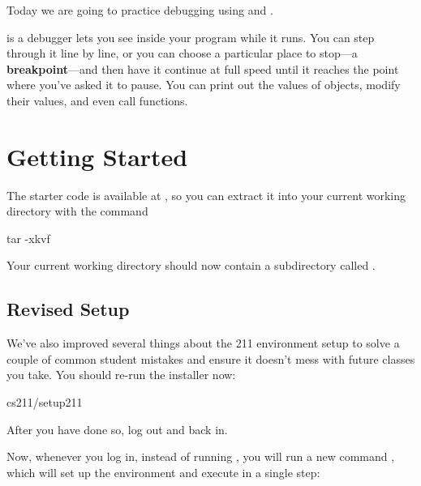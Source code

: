 \documentclass{tufte-handout}
\begin{document}

\maketitle

Today we are going to practice debugging using  and
.

 is a debugger lets you see inside your program while it runs. You can step
through it line by line, or you can choose a particular place to stop—a
\textbf{breakpoint}—and then have it continue at full speed until it reaches
the point where you’ve asked it to pause. You can print out the values of
objects, modify their values, and even call functions.


\section{Getting Started}

The starter code is available at \filename{\ThisLabTgz}, so you can
extract it into your current working directory with the command

\begin{CmdLine*}
  \C tar -xkvf \ThisLabTgz\\
\end{CmdLine*}

\noindent Your current working directory should now contain a
subdirectory called \filename{\ThisLabBase}.


\subsection{Revised Setup}

We've also improved several things about the 211 environment setup
to solve a couple of common student mistakes and ensure it doesn't
mess with future classes you take. You should re-run the installer now:

\begin{CmdLine*}
  \C \plaintilde cs211/setup211\\
\end{CmdLine*}

After you have done so, log out and back in.

Now, whenever you log in, instead of running , you
will run a new command , which will set up the environment
and execute  in a single step:
\end{document}
